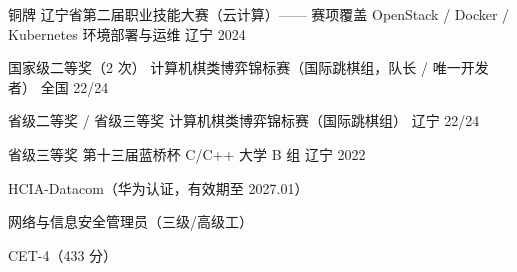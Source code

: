 

\begin{cvhonors}

  \cvhonor
    {铜牌} %
    {辽宁省第二届职业技能大赛（云计算）—— 赛项覆盖 OpenStack / Docker / Kubernetes 环境部署与运维} %
    {辽宁} %
    {2024}

  \cvhonor
    {国家级二等奖（2 次）}
    {计算机棋类博弈锦标赛（国际跳棋组，队长 / 唯一开发者）}
    {全国}
    {22/24}

  \cvhonor
    {省级二等奖 / 省级三等奖}
    {计算机棋类博弈锦标赛（国际跳棋组）}
    {辽宁}
    {22/24}

  \cvhonor
    {省级三等奖} %
    {第十三届蓝桥杯 C/C++ 大学 B 组} %
    {辽宁} %
    {2022}

\end{cvhonors}


\begin{cvhonors}

  \cvhonor
    {HCIA-Datacom（华为认证，有效期至 2027.01）}
    {}
    {}
    {}

  \cvhonor
    {网络与信息安全管理员（三级/高级工）} %
    {} %
    {} %
    {} %

  \cvhonor
    {CET-4（433 分）} %
    {} %
    {} %
    {} %

\end{cvhonors}
